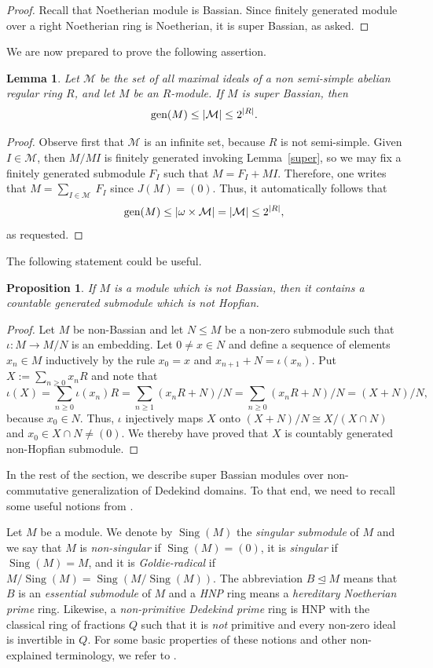 \documentclass{amsart}
\newtheorem{lm}[thm]{Lemma}
\newtheorem{prop}[thm]{Proposition}
\theoremstyle{definition}
\newcommand{\gen}{\text{\rm gen}}
\DeclareMathOperator{\Sing}{{Sing}}
\begin{document}
\begin{proof} Recall that Noetherian module is Bassian. Since finitely generated module over a right Noetherian ring is Noetherian, it is super Bassian, as asked.
\end{proof}

We are now prepared to prove the following assertion.

\begin{lm} Let $\mathcal M$ be the set of all maximal ideals of a non semi-simple abelian regular ring $R$, and let $M$ be an $R$-module. If $M$ is super Bassian, then $$\gen(M)\le |\mathcal M|\le 2^{|R|}.$$
\end{lm}

\begin{proof} Observe first that $\mathcal M$ is an infinite set, because $R$ is not semi-simple. Given $I\in \mathcal M$, then $M/MI$ is finitely generated invoking Lemma~\ref{super}, so we may fix a finitely generated submodule $F_I$ such that $M=F_I+MI$. Therefore, one writes that $M=\sum_{I\in \mathcal{M}}~ F_I$ since $J(M)=(0)$. Thus, it automatically follows that $$\gen(M)\le |\omega\times\mathcal M|=|\mathcal M|\le 2^{|R|},$$ as requested.
\end{proof}

The following statement could be useful.

\begin{prop} If $M$ is a module which is not Bassian, then it contains a countable generated submodule which is not Hopfian.
\end{prop}

\begin{proof} Let $M$ be non-Bassian and let $N\le M$ be a non-zero submodule such that $\iota:M\to M/N$ is an embedding. Let $0\ne x\in N$ and define a sequence of elements $x_n\in M$ inductively by the rule $x_0=x$ and $x_{n+1}+N=\iota(x_n)$. Put $X:=\sum_{n\ge 0}x_nR$ and note that
\[
\iota(X)=\sum_{n\ge 0}\iota(x_n)R =\sum_{n\ge 1} (x_{n}R+N)/N = \sum_{n\ge 0} (x_{n}R+N)/N = (X+N)/N,
\]
because $x_0\in N$. Thus, $\iota$ injectively maps $X$ onto $(X+N)/N\cong X/(X\cap N)$ and $x_0\in X\cap N\ne (0)$. We thereby have proved that $X$ is countably generated non-Hopfian submodule.
\end{proof}

In the rest of the section, we describe super Bassian modules over non-commutative generalization of Dedekind domains. To that end, we need to recall some useful notions from \cite{T}.

Let $M$ be a module. We denote by $\Sing(M)$ the {\it singular submodule} of $M$ and we say that $M$ is {\it non-singular} if $\Sing(M)=(0)$, it is {\it singular} if $\Sing(M)=M$, and it is {\it Goldie-radical} if $M/\Sing(M)=\Sing(M/\Sing(M))$. The abbreviation $B\trianglelefteq M$ means that $B$ is an {\it essential submodule} of $M$ and a {\it HNP} ring means a {\it hereditary Noetherian prime} ring. Likewise, a {\it non-primitive Dedekind prime} ring is HNP with the classical ring of fractions $Q$ such that it is {\it not} primitive and every non-zero ideal is invertible in $Q$. For some basic properties of these notions and other non-explained terminology, we refer to \cite{T}.
\end{document}
